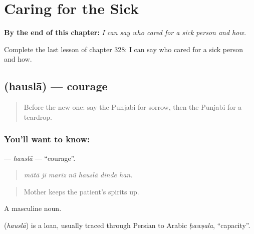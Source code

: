 
\chapter{Caring for the Sick}
\label{ch:pa-a2-caring-for-the-sick}

\begin{chapteropening}
\textbf{By the end of this chapter:} \emph{I can say who cared for a sick person and how.}

Complete the last lesson of chapter 328: I can say who cared for a sick person and how.
\end{chapteropening}

\section[\texorpdfstring{\pa{ਹੌਸਲਾ} (hauslā)}{ਹੌਸਲਾ (hauslā)}]{ (hauslā) — courage}

\label{lesson:PA-C328-hausla}



\begin{quote}
Before the new one: say the Punjabi for sorrow, then the Punjabi for a teardrop.
\end{quote}

\subsection*{You'll want to know: }
\textbf{} — \emph{hauslā} — \textquotedblleft{}courage\textquotedblright{}.

\begin{quote}
      
\end{quote}

\begin{quote}
\emph{mātā jī marīz nū̃ hauslā dinde han.}
\end{quote}

\begin{quote}
Mother keeps the patient's spirits up.
\end{quote}

A masculine noun.

\begin{cousinweb}
\textbf{} (\emph{hauslā}) is a loan, usually traced through Persian to Arabic \emph{ḥawṣala}, \textquotedblleft{}capacity\textquotedblright{}.
\end{cousinweb}

